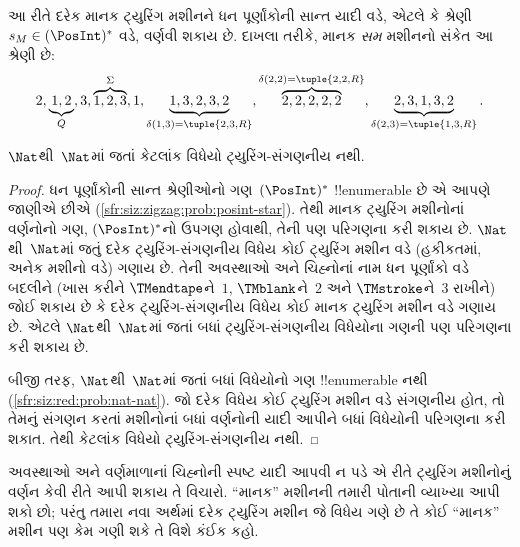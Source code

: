 \documentclass[../../../include/open-logic-section]{subfiles}
\begin{document}
\begin{explain}
આ રીતે દરેક માનક ટ્યુરિંગ મશીનને ધન પૂર્ણાંકોની સાન્ત
યાદી વડે, એટલે કે શ્રેણી $s_M \in (\PosInt)^*$ વડે,
વર્ણવી શકાય છે. દાખલા તરીકે, માનક \emph{સમ} મશીનનો
સંકેત આ શ્રેણી છે:
\[
2, \underbrace{1, 2}_Q, 3, \overbrace{1, 2, 3}^\Sigma, 1, \underbrace{1, 3, 2, 3, 2}_{\delta(1,3) = \tuple{2,3,R}},
\overbrace{2, 2, 2, 2, 2}^{\delta(2,2) = \tuple{2,2,R}},
\underbrace{2, 3, 1, 3, 2}_{\delta(2,3) = \tuple{1,3,R}}.
\]
\end{explain}

\begin{thm}
$\Nat$થી~$\Nat$માં જતાં કેટલાંક વિધેયો ટ્યુરિંગ-સંગણનીય
નથી.
\end{thm}

\begin{proof}
ધન પૂર્ણાંકોની સાન્ત શ્રેણીઓનો ગણ~$(\PosInt)^*$
!!{enumerable} છે એ આપણે જાણીએ છીએ
(\cref{sfr:siz:zigzag:prob:posint-star}). તેથી માનક
ટ્યુરિંગ મશીનોનાં વર્ણનોનો ગણ, $(\PosInt)^*$નો ઉપગણ
હોવાથી, તેની પણ પરિગણના કરી શકાય છે. $\Nat$થી~$\Nat$માં જતું
દરેક ટ્યુરિંગ-સંગણનીય વિધેય કોઈ ટ્યુરિંગ મશીન વડે
(હકીકતમાં, અનેક મશીનો વડે) ગણાય છે. તેની અવસ્થાઓ અને
ચિહ્નોનાં નામ ધન પૂર્ણાંકો વડે બદલીને (ખાસ કરીને
$\TMendtape$ને~$1$, $\TMblank$ને~$2$ અને
$\TMstroke$ને~$3$ રાખીને) જોઈ શકાય છે કે દરેક
ટ્યુરિંગ-સંગણનીય વિધેય કોઈ માનક ટ્યુરિંગ મશીન વડે
ગણાય છે. એટલે $\Nat$થી~$\Nat$માં જતાં બધાં
ટ્યુરિંગ-સંગણનીય વિધેયોના ગણની પણ પરિગણના કરી શકાય છે.

બીજી તરફ, $\Nat$થી~$\Nat$માં જતાં બધાં વિધેયોનો
ગણ !!{enumerable} નથી (\cref{sfr:siz:red:prob:nat-nat}).
જો દરેક વિધેય કોઈ ટ્યુરિંગ મશીન વડે સંગણનીય હોત,
તો તેમનું સંગણન કરતાં મશીનોનાં બધાં વર્ણનોની યાદી
આપીને બધાં વિધેયોની પરિગણના કરી શકાત. તેથી કેટલાંક
વિધેયો ટ્યુરિંગ-સંગણનીય નથી.
\end{proof}

\begin{prob}
  અવસ્થાઓ અને વર્ણમાળાનાં ચિહ્નોની સ્પષ્ટ યાદી આપવી ન
  પડે એ રીતે ટ્યુરિંગ મશીનોનું વર્ણન કેવી રીતે આપી શકાય
  તે વિચારો. ``માનક'' મશીનની તમારી પોતાની વ્યાખ્યા આપી
  શકો છો; પરંતુ તમારા નવા અર્થમાં દરેક ટ્યુરિંગ મશીન
  જે વિધેય ગણે છે તે કોઈ ``માનક'' મશીન પણ કેમ ગણી
  શકે તે વિશે કંઈક કહો.
\end{prob}
\end{document}
